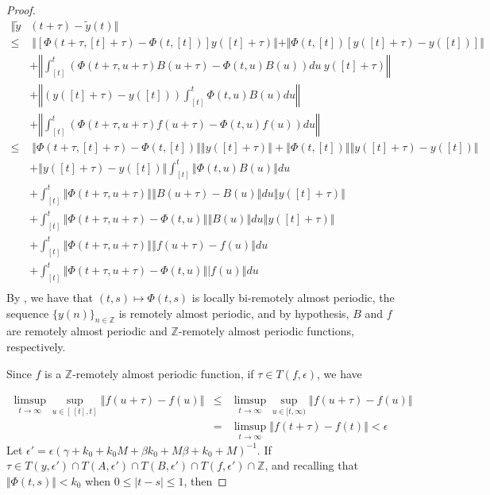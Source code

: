\documentclass[english,,reqno]{amsart}
\numberwithin{equation}{section}
\theoremstyle{plain}
\theoremstyle{definition}
\theoremstyle{remark}
\begin{document}
\begin{proof}
\[
\begin{aligned}
\Vert  \tilde{y} &(t+\tau)-\tilde{y}(t) \Vert 
\\
\leq &~{} \Vert \left[ \Phi(t+\tau, [t]+\tau)-\Phi(t,[t]) \right] y([t]+\tau) \Vert 
+\Vert \Phi(t,[t]) \left[y([t]+\tau)-y([t]) \right]\Vert \\
\ & +\left\Vert \int_{[t]}^{t} \left(\Phi(t+\tau,u+\tau)B(u+\tau)-\Phi(t,u)B(u)\right)du\ y([t]+\tau)\right\Vert\\
\ & + \left\Vert \left(y([t]+\tau)-y([t])\right)\int_{[t]}^{t} \Phi(t,u)B(u)du\right\Vert\\
\ & +\left\Vert \int_{[t]}^{t} \left(\Phi(t+\tau, u+\tau)f(u+\tau)-\Phi(t,u)f(u)\right)du\right\Vert \\
\leq&~{} \Vert\Phi(t+\tau,[t]+\tau)-\Phi(t,[t])\Vert \left\Vert y([t]+\tau)\right\Vert 
+\left\Vert \Phi(t,[t])\right\Vert \Vert y([t]+\tau)-y([t])\Vert \\
&+\left\Vert y([t]+\tau)-y([t])\right\Vert \int_{[t]}^{t}\left\Vert \Phi(t,u)B(u)\right\Vert du\\
&+\int_{[t]}^{t}\left\Vert \Phi(t+\tau,u+\tau)\right\Vert \left\Vert B(u+\tau)-B(u)\right\Vert du\left\Vert y([t]+\tau)\right\Vert \\
&+\int_{[t]}^{t}\left\Vert \Phi(t+\tau,u+\tau)-\Phi(t,u)\right\Vert \left\Vert B(u)\right\Vert du\left\Vert y([t]+\tau)\right\Vert \\
&+\int_{[t]}^{t}\left\Vert \Phi(t+\tau,u+\tau)\right\Vert \left\Vert f(u+\tau)-f(u)\right\Vert du
\\&+\int_{[t]}^{t}\left\Vert \Phi(t+\tau,u+\tau)-\Phi(t,u)\right\Vert \left|f(u)\right\Vert du\\
\end{aligned}
\]
By \cite[Theorem 2]{pinto_remotely}, we have that $(t,s)\mapsto\Phi(t, s)$ is locally bi-remotely almost periodic,  
the sequence $\{y(n)\}_{n \in \mathbb{Z}}$ is remotely almost periodic,  
and by hypothesis, $B$ and $f$ are remotely almost periodic and $\mathbb{Z}$-remotely almost periodic functions, respectively.

Since $f$ is a $\mathbb{Z}$-remotely almost periodic function, if $\tau \in T(f, \epsilon)$, we have

\begin{eqnarray*}
\limsup_{t\rightarrow\infty} \sup_{u\in[\,[t],t]}\left\Vert f(u+\tau)-f(u)\right\Vert
&\leq&
\limsup_{t\rightarrow\infty} \sup_{u\in[t,\infty)}\left\Vert f(u+\tau)-f(u)\right\Vert \\
&=& \limsup_{t\rightarrow\infty} \left\Vert f(t+\tau)-f(t)\right\Vert <\epsilon
\end{eqnarray*}
Let $\epsilon' = \epsilon(\gamma + k_0 + k_0 M + \beta k_0 + M \beta + k_0 + M)^{-1}$.  
If $\tau \in T(y, \epsilon') \cap T(A, \epsilon') \cap T(B, \epsilon') \cap T(f, \epsilon') \cap \mathbb{Z}$,  
and recalling that $\Vert \Phi(t,s) \Vert < k_0$ when $0 \leq |t - s| \leq 1$, then


\end{proof}
\end{document}

